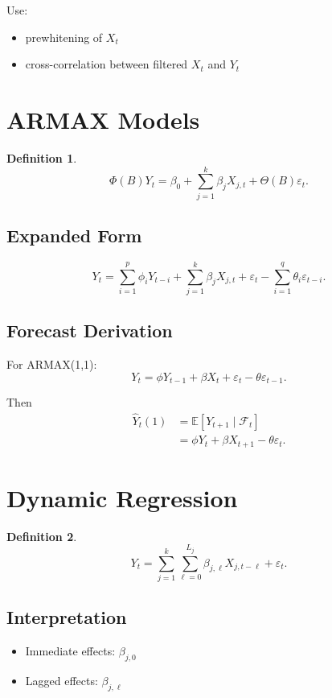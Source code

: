 \documentclass[12pt,oneside]{book}
\numberwithin{equation}{section}
\theoremstyle{definition}
\newtheorem{definition}{Definition}[section]
\theoremstyle{plain}
\theoremstyle{remark}
\newcommand{\E}{\mathbb{E}}
\begin{document}
Use:
\begin{itemize}
\item prewhitening of $X_t$
\item cross-correlation between filtered $X_t$ and $Y_t$
\end{itemize}

\section{ARMAX Models}

\begin{definition}
\[
\Phi(B)Y_t = \beta_0 + \sum_{j=1}^k \beta_j X_{j,t} + \Theta(B)\varepsilon_t.
\]
\end{definition}

\subsection{Expanded Form}

\[
Y_t =
\sum_{i=1}^p \phi_i Y_{t-i}
+
\sum_{j=1}^k \beta_j X_{j,t}
+
\varepsilon_t
-
\sum_{i=1}^q \theta_i \varepsilon_{t-i}.
\]

\subsection{Forecast Derivation}

For ARMAX(1,1):
\[
Y_t = \phi Y_{t-1} + \beta X_t + \varepsilon_t - \theta \varepsilon_{t-1}.
\]

Then
\begin{align*}
\widehat{Y}_t(1)
&= \E[Y_{t+1} \mid \mathcal{F}_t] \\
&= \phi Y_t + \beta X_{t+1} - \theta \varepsilon_t.
\end{align*}

\section{Dynamic Regression}

\begin{definition}
\[
Y_t = \sum_{j=1}^k \sum_{\ell=0}^{L_j} \beta_{j,\ell} X_{j,t-\ell} + \varepsilon_t.
\]
\end{definition}

\subsection{Interpretation}

\begin{itemize}
\item Immediate effects: $\beta_{j,0}$
\item Lagged effects: $\beta_{j,\ell}$
\end{itemize}
\end{document}
